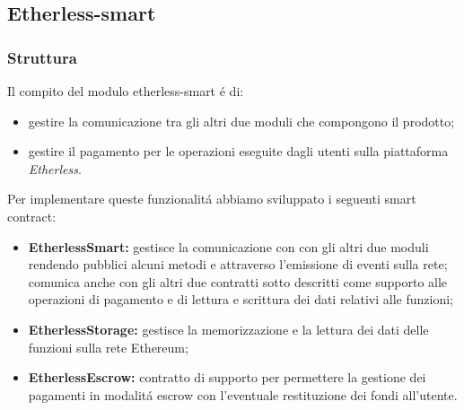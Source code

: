 \subsection{Etherless-smart}
\subsubsection{Struttura}
  Il compito del modulo etherless-smart é di:
  \begin{itemize}
    \item gestire la comunicazione tra gli altri due moduli che compongono il prodotto;
    \item gestire il pagamento per le operazioni eseguite dagli utenti sulla piattaforma \textit{Etherless}.
  \end{itemize}
  Per implementare queste funzionalitá abbiamo sviluppato i seguenti smart contract:
  \begin{itemize}
    \item \textbf{EtherlessSmart:} gestisce la comunicazione con con gli altri due moduli rendendo pubblici alcuni metodi e attraverso l'emissione di eventi sulla rete; comunica anche con gli altri due contratti sotto descritti come supporto alle operazioni di pagamento e di lettura e scrittura dei dati relativi alle funzioni;
    \item \textbf{EtherlessStorage:} gestisce la memorizzazione e la lettura dei dati delle funzioni sulla rete Ethereum;
    \item \textbf{EtherlessEscrow:} contratto di supporto per permettere la gestione dei pagamenti in modalitá escrow con l'eventuale restituzione dei fondi all'utente.
  \end{itemize}
